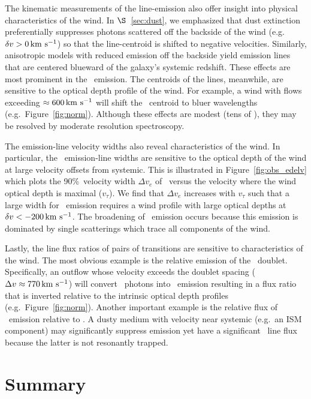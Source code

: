 \documentclass[12pt,preprint]{aastex}
\begin{document}
The kinematic measurements of the line-emission also offer insight into physical
characteristics of the wind.
In $\S$~\ref{sec:dust}, we emphasized that dust extinction
preferentially suppresses photons scattered off the backside of the
wind (e.g.\ $\delta v > 0 \, {\rm km~s^{-1}}$) so that the line-centroid is shifted to
negative velocities.  Similarly, anisotropic models with reduced
emission off the backside yield emission lines that are centered
blueward of the galaxy's systemic redshift.  These effects are most
prominent in the \feiis\ emission.  The centroids of the 
lines, meanwhile, are sensitive to the optical depth
profile of the wind.   For example, a wind with flows exceeding
$\approx 600 \, {\rm km~s^{-1}}$ will shift the \mgiia\ centroid to bluer
wavelengths (e.g.\ Figure~\ref{fig:norm}).
Although these effects are modest (tens of
\kms), they may be resolved by moderate resolution spectroscopy.

The emission-line velocity widths also reveal
characteristics of the wind.  In particular, the \feiis\ emission-line 
widths are
sensitive to the optical depth of the wind at large velocity offsets from
systemic.  This is illustrated in Figure~\ref{fig:obs_edelv} which plots
the 90\%\ velocity width $\Delta v_e$ of \feiic\ versus the velocity
where the wind optical depth is maximal ($v_\tau$).  We find that
$\Delta v_e$ increases with $v_\tau$ such that a large width for
\feiis\ emission requires a wind profile with large optical depths at
$\delta v < -200 \, {\rm km~s^{-1}}$.  The broadening of \feiis\ emission occurs
because this emission is dominated by single scatterings 
which trace all components of the wind.  

Lastly, the line flux ratios of pairs of transitions 
are sensitive to characteristics of the wind.
The most obvious example is the relative emission of the \mgiid\
doublet.  Specifically, an outflow whose velocity exceeds the doublet
spacing ($\Delta v \approx 770 \, {\rm km~s^{-1}}$) will convert \mgiia\ photons
into \mgiib\ emission resulting in a flux ratio that is inverted
relative to the intrinsic optical depth profiles (e.g.\
Figure~\ref{fig:norm}).  Another important example is the relative
flux of \feiis\ emission relative to .  
A dusty medium with velocity near systemic (e.g.\ an
ISM component) may significantly suppress \ion{Mg}{2} emission yet
have a significant \feiis\ line flux because the latter is not
resonantly trapped.  

\section{Summary}
\label{sec:summary}
\end{document}
